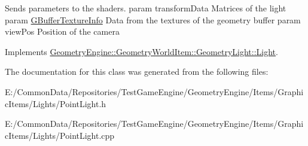 Sends parameters to the shaders. param transform\+Data Matrices of the light param \mbox{\hyperlink{struct_geometry_engine_1_1_g_buffer_texture_info}{G\+Buffer\+Texture\+Info}} Data from the textures of the geometry buffer param view\+Pos Position of the camera 

Implements \mbox{\hyperlink{class_geometry_engine_1_1_geometry_world_item_1_1_geometry_light_1_1_light_a366be5945389fe58df4bf5aa8c43138f}{Geometry\+Engine\+::\+Geometry\+World\+Item\+::\+Geometry\+Light\+::\+Light}}.



The documentation for this class was generated from the following files\+:\begin{DoxyCompactItemize}
\item 
E\+:/\+Common\+Data/\+Repositories/\+Test\+Game\+Engine/\+Geometry\+Engine/\+Items/\+Graphic\+Items/\+Lights/Point\+Light.\+h\item 
E\+:/\+Common\+Data/\+Repositories/\+Test\+Game\+Engine/\+Geometry\+Engine/\+Items/\+Graphic\+Items/\+Lights/Point\+Light.\+cpp\end{DoxyCompactItemize}
